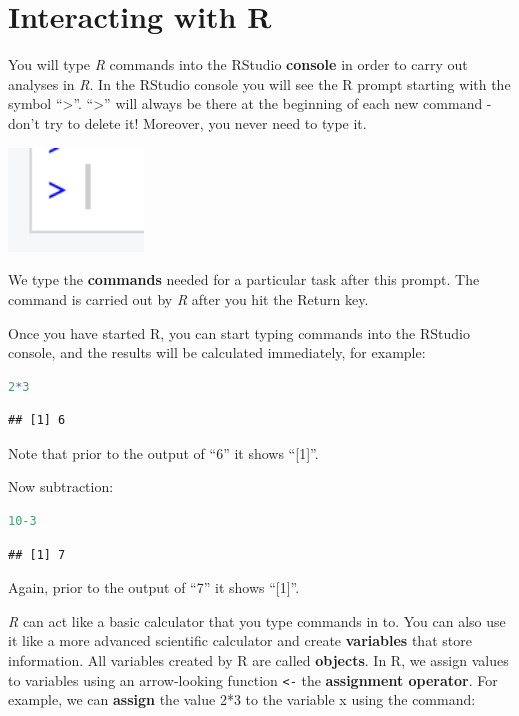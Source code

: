 \documentclass[
]{book}
\newcommand{\passthrough}[1]{#1}
\begin{document}
\hypertarget{interacting-with-r}{%
\section{Interacting with R}\label{interacting-with-r}}

You will type \emph{R} commands into the RStudio \textbf{console} in order to carry out analyses in \emph{R}. In the RStudio console you will see the R prompt starting with the symbol ``\textgreater{}''. ``\textgreater{}'' will always be there at the beginning of each new command - don't try to delete it! Moreover, you never need to type it.

\includegraphics[width=1.42in]{images/R_cursor}

We type the \textbf{commands} needed for a particular task after this prompt. The command is carried out by \emph{R} after you hit the Return key.

Once you have started R, you can start typing commands into the RStudio console, and the results will be calculated immediately, for example:

\begin{lstlisting}[language=R]
2*3
\end{lstlisting}

\begin{lstlisting}
## [1] 6
\end{lstlisting}

Note that prior to the output of ``6'' it shows ``{[}1{]}''.

Now subtraction:

\begin{lstlisting}[language=R]
10-3
\end{lstlisting}

\begin{lstlisting}
## [1] 7
\end{lstlisting}

Again, prior to the output of ``7'' it shows ``{[}1{]}''.

\emph{R} can act like a basic calculator that you type commands in to. You can also use it like a more advanced scientific calculator and create \textbf{variables} that store information. All variables created by R are called \textbf{objects}. In R, we assign values to variables using an arrow-looking function \passthrough{\lstinline!<-!} the \textbf{assignment operator}. For example, we can \textbf{assign} the value 2*3 to the variable x using the command:
\end{document}
